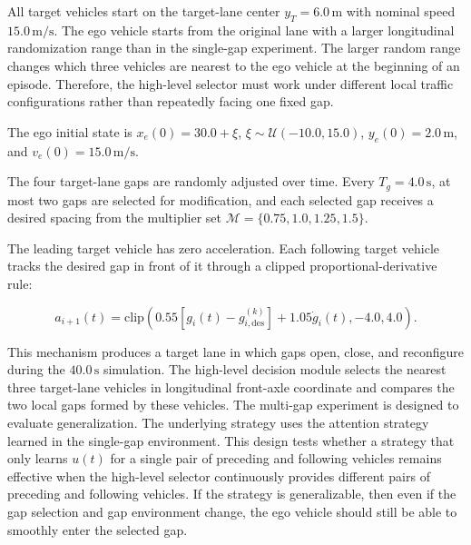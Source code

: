 All target vehicles start on the target-lane center \(y_T=6.0\,\mathrm{m}\) with nominal speed \(15.0\,\mathrm{m/s}\). The ego vehicle starts from the original lane with a larger longitudinal randomization range than in the single-gap experiment. The larger random range changes which three vehicles are nearest to the ego vehicle at the beginning of an episode. Therefore, the high-level selector must work under different local traffic configurations rather than repeatedly facing one fixed gap.





The ego initial state is \(x_e(0)=30.0+\xi\), \(\xi\sim\mathcal{U}(-10.0,15.0)\), \(y_e(0)=2.0\,\mathrm{m}\), and \(v_e(0)=15.0\,\mathrm{m/s}\).





The four target-lane gaps are randomly adjusted over time. Every \(T_g=4.0\,\mathrm{s}\), at most two gaps are selected for modification, and each selected gap receives a desired spacing from the multiplier set \(\mathcal{M}=\{0.75,1.0,1.25,1.5\}\).





The leading target vehicle has zero acceleration. Each following target vehicle tracks the desired gap in front of it through a clipped proportional-derivative rule:



{\small
\begin{equation}
a_{i+1}(t)=
\mathrm{clip}
\left(
0.55\left[g_i(t)-g_{i,\mathrm{des}}^{(k)}\right]
 +1.05\dot{g}_i(t),
-4.0,
4.0
\right).
\end{equation}
}





This mechanism produces a target lane in which gaps open, close, and reconfigure during the \(40.0\,\mathrm{s}\) simulation. The high-level decision module selects the nearest three target-lane vehicles in longitudinal front-axle coordinate and compares the two local gaps formed by these vehicles. The multi-gap experiment is designed to evaluate generalization. The underlying strategy uses the attention strategy learned in the single-gap environment. This design tests whether a strategy that only learns \(u(t)\) for a single pair of preceding and following vehicles remains effective when the high-level selector continuously provides different pairs of preceding and following vehicles. If the strategy is generalizable, then even if the gap selection and gap environment change, the ego vehicle should still be able to smoothly enter the selected gap.





